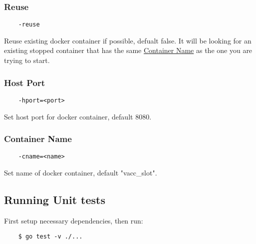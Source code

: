 \subsubsection{Reuse}
\begin{verbatim}
    -reuse
\end{verbatim}
Reuse existing docker container if possible, defualt false. It will be looking for an existing stopped container that has the same \hyperref[ref:ContainerName]{Container Name} as the one you are trying to start.

\subsubsection{Host Port}
\begin{verbatim}
    -hport=<port>
\end{verbatim}
Set host port for docker container, default 8080.

\subsubsection{Container Name}\label{ref:ContainerName}
\begin{verbatim}
    -cname=<name>
\end{verbatim}
Set name of docker container, default "vacc{\_}slot".

\subsection{Running Unit tests}
First setup necessary dependencies, then run:
\begin{verbatim}
    $ go test -v ./...
\end{verbatim}